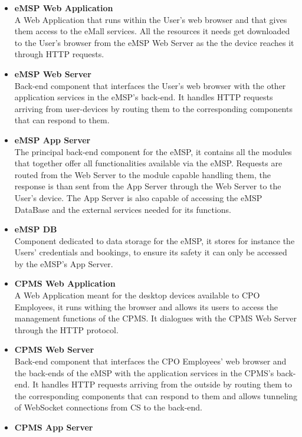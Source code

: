 \documentclass[11pt]{article}
\begin{document}
\begin{itemize}
    \item \textbf{eMSP Web Application} \\
        A Web Application that runs within the User’s web browser and that gives them access to the eMall services. All the resources it needs get downloaded to the User's browser from the eMSP Web Server as the the device reaches it through HTTP requests.
    \item \textbf{eMSP Web Server} \\
        Back-end component that interfaces the User's web browser with the other application services in the eMSP's back-end. It handles HTTP requests arriving from user-devices by routing them to the corresponding components that can respond to them.
    \item \textbf{eMSP App Server} \\
        The principal back-end component for the eMSP, it contains all the modules that together offer all functionalities available via the eMSP. Requests are routed from the Web Server to the module capable handling them, the response is than sent from the App Server through the Web Server to the User's device. The App Server is also capable of accessing the eMSP DataBase and the external services needed for its functions.
    \item \textbf{eMSP DB} \\
        Component dedicated to data storage for the eMSP, it stores for instance the Users' credentials and bookings, to ensure its safety it can only be accessed by the eMSP's App Server.
    \item \textbf{CPMS Web Application} \\
        A Web Application meant for the desktop devices available to CPO Employees, it runs withing the browser and allows its users to access the management functions of the CPMS. It dialogues with the CPMS Web Server through the HTTP protocol.
    \item \textbf{CPMS Web Server} \\
        Back-end component that interfaces the CPO Employees' web browser and the back-ends of the eMSP with the application services in the CPMS's back-end. It handles HTTP requests arriving from the outside by routing them to the corresponding components that can respond to them and allows tunneling of WebSocket connections from CS to the back-end.
    \item \textbf{CPMS App Server} \\

\end{itemize}
\end{document}
